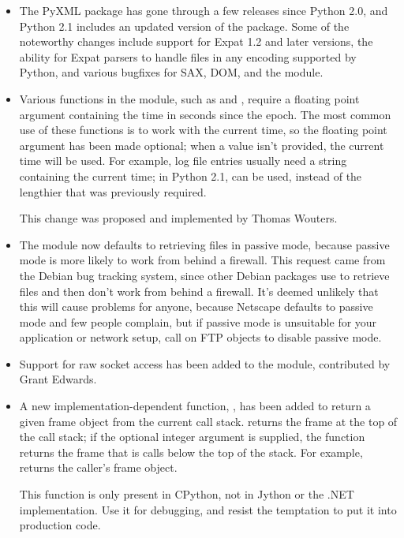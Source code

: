 \documentclass{howto}
\begin{document}
\begin{itemize}
\item The PyXML package has gone through a few releases since Python
2.0, and Python 2.1 includes an updated version of the 
package.  Some of the noteworthy changes include support for Expat 1.2
and later versions, the ability for Expat parsers to handle files in
any encoding supported by Python, and various bugfixes for SAX, DOM,
and the  module.

\item Various functions in the  module, such as
 and , require a floating
point argument containing the time in seconds since the epoch.  The
most common use of these functions is to work with the current time,
so the floating point argument has been made optional; when a value
isn't provided, the current time will be used.  For example, log file
entries usually need a string containing the current time; in Python
2.1,  can be used, instead of the lengthier
 that was previously
required.
 
This change was proposed and implemented by Thomas Wouters.

\item The  module now defaults to retrieving files in
passive mode, because passive mode is more likely to work from behind
a firewall.  This request came from the Debian bug tracking system,
since other Debian packages use  to retrieve files and
then don't work from behind a firewall.  It's deemed unlikely that
this will cause problems for anyone, because Netscape defaults to
passive mode and few people complain, but if passive mode is
unsuitable for your application or network setup, call
 on FTP objects to disable passive mode.

\item Support for raw socket access has been added to the
 module, contributed by Grant Edwards.

\item A new implementation-dependent function, ,
has been added to return a given frame object from the current call stack.
 returns the frame at the top of the call stack; 
if the optional integer argument  is supplied, the function returns the frame
that is  calls below the top of the stack.  For example, 
returns the caller's frame object.

This function is only present in CPython, not in Jython or the .NET
implementation.  Use it for debugging, and resist the temptation to
put it into production code.



\end{itemize}
\end{document}
